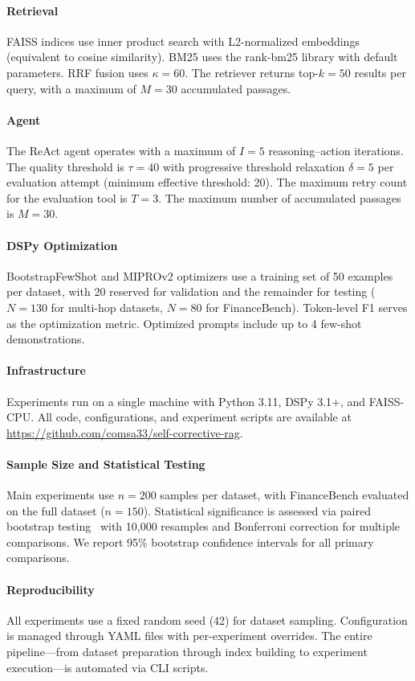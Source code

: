 \paragraph{Retrieval}
FAISS indices use inner product search with L2-normalized embeddings (equivalent to cosine similarity).
BM25 uses the rank-bm25 library with default parameters.
RRF fusion uses $\kappa = 60$.
The retriever returns top-$k = 50$ results per query, with a maximum of $M = 30$ accumulated passages.

\paragraph{Agent}
The ReAct agent operates with a maximum of $I = 5$ reasoning--action iterations.
The quality threshold is $\tau = 40$ with progressive threshold relaxation $\delta = 5$ per evaluation attempt (minimum effective threshold: 20).
The maximum retry count for the evaluation tool is $T = 3$.
The maximum number of accumulated passages is $M = 30$.

\paragraph{DSPy Optimization}
BootstrapFewShot and MIPROv2 optimizers use a training set of 50 examples per dataset, with 20 reserved for validation and the remainder for testing ($N = 130$ for multi-hop datasets, $N = 80$ for FinanceBench).
Token-level F1 serves as the optimization metric.
Optimized prompts include up to 4 few-shot demonstrations.

\paragraph{Infrastructure}
Experiments run on a single machine with Python 3.11, DSPy 3.1+, and FAISS-CPU.
All code, configurations, and experiment scripts are available at \url{https://github.com/comsa33/self-corrective-rag}.

\paragraph{Sample Size and Statistical Testing}
Main experiments use $n = 200$ samples per dataset, with FinanceBench evaluated on the full dataset ($n = 150$).
Statistical significance is assessed via paired bootstrap testing~\cite{efron1993bootstrap} with 10,000 resamples and Bonferroni correction for multiple comparisons.
We report 95\% bootstrap confidence intervals for all primary comparisons.

\paragraph{Reproducibility}
All experiments use a fixed random seed (42) for dataset sampling.
Configuration is managed through YAML files with per-experiment overrides.
The entire pipeline---from dataset preparation through index building to experiment execution---is automated via CLI scripts.
